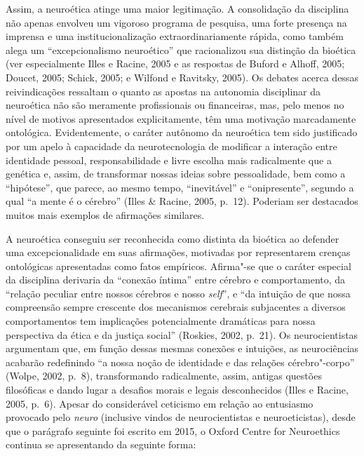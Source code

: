 Assim, a neuroética atinge uma maior legitimação. A consolidação da disciplina não
apenas envolveu um vigoroso programa de pesquisa, uma forte presença na
imprensa e uma institucionalização extraordinariamente rápida, como
também alega um ``excepcionalismo neuroético'' que racionalizou sua
distinção da bioética (ver especialmente Illes e Racine, 2005 e as
respostas de Buford e Alhoff, 2005; Doucet, 2005; Schick, 2005; e
Wilfond e Ravitsky, 2005). Os debates acerca dessas reivindicações
ressaltam o quanto as apostas na autonomia disciplinar da neuroética não
são meramente profissionais ou financeiras, mas, pelo menos no nível de
motivos apresentados explicitamente, têm uma motivação marcadamente
ontológica. Evidentemente, o caráter autônomo da neuroética tem sido
justificado por um apelo à capacidade da neurotecnologia de modificar a
interação entre identidade pessoal, responsabilidade e livre escolha
mais radicalmente que a genética e, assim, de transformar nossas ideias
sobre pessoalidade, bem como a ``hipótese'', que parece, ao mesmo tempo,
``inevitável'' e ``onipresente'', segundo a qual ``a mente é o cérebro''
(Illes \& Racine, 2005, p.~12). Poderiam ser destacados muitos mais
exemplos de afirmações similares.

A neuroética conseguiu ser reconhecida como distinta da bioética ao
defender uma excepcionalidade em suas afirmações, motivadas por
representarem crenças ontológicas apresentadas como fatos empíricos. Afirma"-se que
o caráter especial da disciplina derivaria da ``conexão íntima''
entre cérebro e comportamento, da ``relação peculiar entre nossos
cérebros e nosso \emph{self}'', e ``da intuição de que nossa compreensão sempre
crescente dos mecanismos cerebrais subjacentes a diversos comportamentos
tem implicações potencialmente dramáticas para nossa perspectiva da
ética e da justiça social'' (Roskies, 2002, p.~21). Os neurocientistas
argumentam que, em função dessas mesmas conexões e intuições, as
neurociências acabarão redefinindo ``a nossa noção de identidade e das
relações cérebro"-corpo'' (Wolpe, 2002, p.~8), transformando radicalmente,
assim, antigas questões filosóficas e dando lugar a desafios morais e
legais desconhecidos (Illes e Racine, 2005, p.~6). Apesar do considerável
ceticismo em relação ao entusiasmo provocado pelo \emph{neuro}
(inclusive vindos de neurocientistas e neuroeticistas), desde que o
parágrafo seguinte foi escrito em 2015, o Oxford Centre for Neuroethics
continua se apresentando da seguinte forma:

